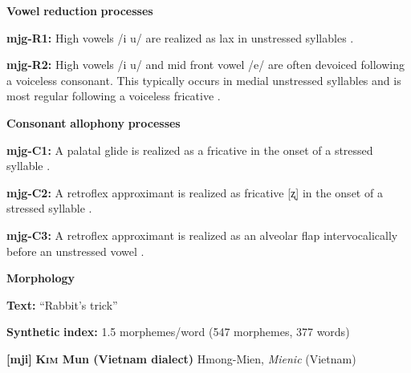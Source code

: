 \begin{styleBody}
\textbf{Vowel} \textbf{reduction} \textbf{processes}
\end{styleBody}

\begin{styleBody}
\textbf{mjg-R1:} High vowels /i u/ are realized as lax in unstressed syllables \citep[35]{Slater2003}.
\end{styleBody}

\begin{styleBody}
\textbf{mjg-R2:} High vowels /i u/ and mid front vowel /e/ are often devoiced following a voiceless consonant. This typically occurs in medial unstressed syllables and is most regular following a voiceless fricative \citep[36]{Slater2003}.
\end{styleBody}

\begin{styleBody}
\textbf{Consonant} \textbf{allophony} \textbf{processes}
\end{styleBody}

\begin{styleBody}
\textbf{mjg-C1:} A palatal glide is realized as a fricative in the onset of a stressed syllable \citep[31-2]{Slater2003}.
\end{styleBody}

\begin{styleBody}
\textbf{mjg-C2:} A retroflex approximant is realized as fricative [ʐ] in the onset of a stressed syllable \citep[30]{Slater2003}.
\end{styleBody}

\begin{styleBody}
\textbf{mjg-C3:} A retroflex approximant is realized as an alveolar flap intervocalically before an unstressed vowel \citep[31]{Slater2003}.
\end{styleBody}

\begin{styleBody}
\textbf{Morphology}
\end{styleBody}

\begin{styleBody}
\textbf{Text:} “Rabbit’s trick” \citep[343-350]{Slater2003}
\end{styleBody}

\begin{styleBody}
\textbf{Synthetic} \textbf{index:} 1.5 morphemes/word (547 morphemes, 377 words)
\end{styleBody}

\begin{styleBody}
\textbf{[mji]}   \textbf{\textsc{Kim} \textbf{Mun} \textbf{(Vietnam} \textbf{dialect)}}  Hmong-Mien, \textit{Mienic} (Vietnam)
\end{styleBody}

